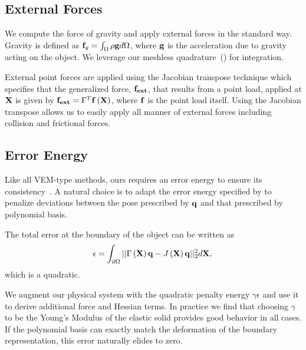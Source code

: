\subsection{External Forces}
We compute the force of gravity and apply external forces in the standard way.
Gravity is defined as $\mathbf{f}_g = \int_{\Omega} \rho\mathbf{g} d\Omega$, where $\mathbf{g}$ is the acceleration due to gravity acting on the object. 
We leverage our meshless quadrature~() for integration.

External point forces are applied using the Jacobian transpose technique which specifies that the generalized force, $\mathbf{f_{ext}}$, 
that results from a point load, applied at $\mathbf{X}$ is given by $\mathbf{f_{ext}}=\Gamma^T\mathbf{f}\left(\mathbf{X}\right)$, where $\mathbf{f}$ is the point load itself.
Using the Jacobian transpose allows us to easily apply all manner of external forces including collision and frictional forces. 

\subsection{Error Energy}
\label{ssec:error_energy}
Like all VEM-type methods, ours requires an error energy to ensure its consistency~\cite{10.1142/S021820251440003X}.
A natural choice is to adapt the error energy specified by \citet{10.1145/1073204.1073216} to penalize deviations between the pose prescribed by  $\mathbf{q}$ and 
that prescribed by polynomial basis. 

The total error at the boundary of the object can be written as
\begin{equation}
\epsilon = \int_{\partial\Omega}||\Gamma\left(\mathbf{X}\right)\mathbf{q} - J\left(\mathbf{X}\right)\mathbf{q}||_2^2 d\mathbf{X}, \\
\end{equation} which is a quadratic.

We augment our physical system with the  quadratic penalty energy $\gamma\epsilon$ and use it to derive additional force and Hessian terms.
In practice we find that choosing $\gamma $ to be the Young's Modulus of the elastic solid provides good behavior in all cases.
If the polynomial basis can exactly match the deformation of the boundary representation, this error naturally elides to zero.

